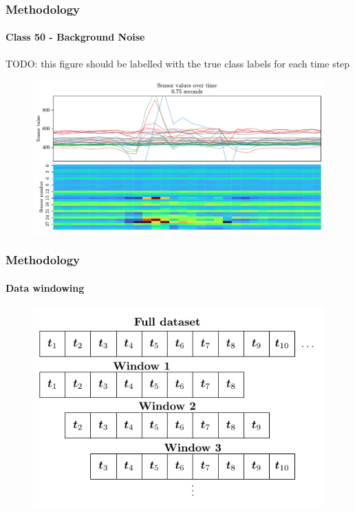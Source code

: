 \documentclass[xcolor={svgnames,table},10pt,fleqn]{beamer}
\begin{document}
\begin{frame}
    \frametitle{Methodology}
    \framesubtitle{Class 50 - Background Noise}

    TODO: this figure should be labelled with the true class labels for each
    time step
    \begin{figure}[h]
        \centering
        \includegraphics[width=\textwidth]{imgs/05_sensors_over_time_3230_30}
    \end{figure}
\end{frame}

\begin{frame}
    \frametitle{Methodology}
    \framesubtitle{Data windowing}
    \begin{figure}[h]
        \centering
        \includegraphics[width=\textwidth]{imgs/windowing_tikz.pdf}
    \end{figure}
\end{frame}
\end{document}
